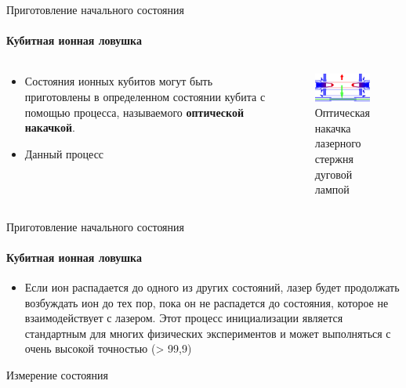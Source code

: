 \documentclass{beamer}
\begin{document}
    \begin{frame}{Приготовление начального состояния}
    \framesubtitle{Кубитная ионная ловушка}

    \begin{columns}

    \begin{column}{0.5\textwidth}

        \begin{itemize}
                \item <1-> Состояния ионных кубитов могут быть приготовлены в определенном состоянии кубита с помощью процесса, называемого \textbf{оптической накачкой}.
                \item <2-> Данный процесс
        \end{itemize}

    \end{column}

    \begin{column}{0.5\textwidth}

        \begin{figure}
            \centering
            \includegraphics[width=\textwidth]{media/optical-pumping.png}
            \caption{Оптическая накачка лазерного стержня дуговой лампой}
        \end{figure}

    \end{column}

    \end{columns}


    \end{frame}

    \begin{frame}{Приготовление начального состояния}
    \framesubtitle{Кубитная ионная ловушка}

    \begin{itemize}
            \item <1-> Если ион распадается до одного из других состояний, лазер будет продолжать возбуждать ион до тех пор, пока он не распадется до состояния, которое не взаимодействует с лазером. Этот процесс инициализации является стандартным для многих физических экспериментов и может выполняться с очень высокой точностью (> 99,9)
    \end{itemize}

    \end{frame}


    \begin{frame}{Измерение состояния}

    \end{frame}
\end{document}
